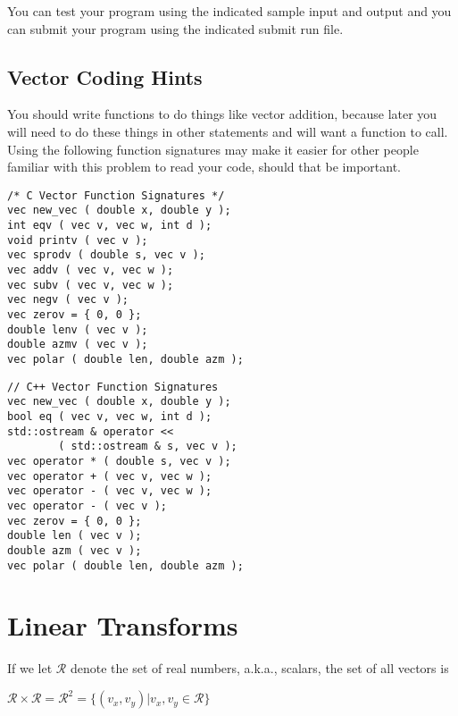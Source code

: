\documentclass[12pt]{article}
\begin{document}
You can test your program using the indicated sample input and
output and you can submit your program using the indicated submit
run file.

\subsection{Vector Coding Hints}

You should write functions to do things like vector addition,
because later you will need to do these things in other
statements and will want a function to call.  Using the following
function signatures may make it easier
for other people familiar with this problem to read your
code, should that be important.

\hspace*{0.5in}\begin{minipage}{4.0in}
\begin{verbatim}
/* C Vector Function Signatures */
vec new_vec ( double x, double y );
int eqv ( vec v, vec w, int d );
void printv ( vec v );
vec sprodv ( double s, vec v );
vec addv ( vec v, vec w );
vec subv ( vec v, vec w );
vec negv ( vec v );
vec zerov = { 0, 0 };
double lenv ( vec v );
double azmv ( vec v );
vec polar ( double len, double azm );
\end{verbatim}
\end{minipage}

\bigskip

\hspace*{0.5in}\begin{minipage}{4.0in}
\begin{verbatim}
// C++ Vector Function Signatures
vec new_vec ( double x, double y );
bool eq ( vec v, vec w, int d );
std::ostream & operator <<
        ( std::ostream & s, vec v );
vec operator * ( double s, vec v );
vec operator + ( vec v, vec w );
vec operator - ( vec v, vec w );
vec operator - ( vec v );
vec zerov = { 0, 0 };
double len ( vec v );
double azm ( vec v );
vec polar ( double len, double azm );
\end{verbatim}
\end{minipage}

\section{Linear Transforms}
If we let $\mathcal{R}$ denote the set of real numbers,
a.k.a., scalars, the set of all vectors is \\
\centerline{
$\mathcal{R}\times\mathcal{R}=\mathcal{R}^2
    =\{(v_x,v_y)|v_x,v_y\in \mathcal{R}\}$}
\end{document}
